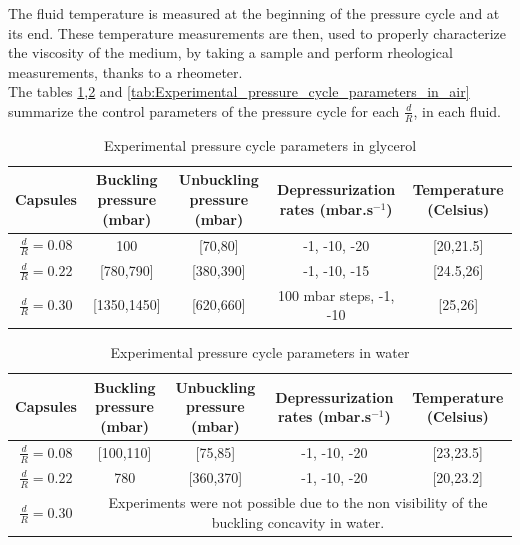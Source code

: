 The fluid temperature is measured at the beginning of the pressure cycle and at its end. These temperature measurements are then, used to properly characterize the viscosity of the medium, by taking a sample and perform rheological measurements, thanks to a rheometer.\\
The tables \ref{tab:Experimental_pressure_cycle_parameters_in_glycerol},\ref{tab:Experimental_pressure_cycle_parameters_in_water} and \ref{tab:Experimental_pressure_cycle_parameters_in_air} summarize the control parameters of the pressure cycle for each $\frac{d}{R}$, in each fluid.
\begin{table}[H]
	\centering
		\begin{adjustbox}{width=\textwidth}
			\begin{tabular}{|c|c|c|c|c|}
				\hline
				Capsules & Buckling pressure (mbar) & Unbuckling pressure (mbar) & Depressurization rates (mbar.s$^{-1}$) & Temperature (Celsius) \\
				\hline
				$\frac{d}{R} = 0.08$ & 100 & [70,80] & -1, -10, -20 & [20,21.5]\\
				\hline
				$\frac{d}{R} = 0.22$ & [780,790] & [380,390] & -1, -10, -15 & [24.5,26]\\
				\hline
				$\frac{d}{R} = 0.30$ & [1350,1450] & [620,660] & 100 mbar steps, -1, -10 & [25,26]\\
				\hline
			\end{tabular}
		\end{adjustbox}
	
	\caption{Experimental pressure cycle parameters in glycerol}
	\label{tab:Experimental_pressure_cycle_parameters_in_glycerol}
\end{table}

\begin{table}[H]
	\centering
		\begin{adjustbox}{width=\textwidth}
			\begin{tabular}{|c|c|c|c|c|}
				\hline
				Capsules & Buckling pressure (mbar) & Unbuckling pressure (mbar) & Depressurization rates (mbar.s$^{-1}$) & Temperature (Celsius) \\
				\hline
				$\frac{d}{R} = 0.08 $ & [100,110]& [75,85] & -1, -10, -20 & [23,23.5]\\
				\hline
				$\frac{d}{R} = 0.22$ & 780 & [360,370] & -1, -10, -20 & [20,23.2]\\
				\hline
				$\frac{d}{R} = 0.30$ &  \multicolumn{4}{c|}{Experiments were not possible due to the non visibility of the buckling concavity in water.}\\
				\hline
			\end{tabular}
		\end{adjustbox}
	
	\caption{Experimental pressure cycle parameters in water}
	\label{tab:Experimental_pressure_cycle_parameters_in_water}
\end{table}

